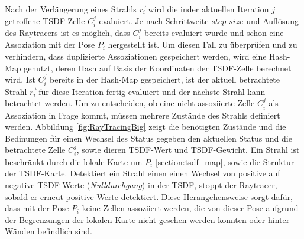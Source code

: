 Nach der Verlängerung eines Strahls $\vec{r_i}$ wird die inder aktuellen Iteration $j$ getroffene TSDF-Zelle $C_i^j$ evaluiert. Je nach Schrittweite $step\_size$ und Auflösung des Raytracers ist es möglich, dass $C_i^j$ bereits evaluiert wurde und schon eine Assoziation mit der Pose $P_i$ hergestellt ist. Um diesen Fall zu überprüfen und zu verhindern, dass duplizierte Assoziationen gespeichert werden, wird eine Hash-Map genutzt, deren Hash auf Basis der Koordinaten der TSDF-Zelle berechnet wird. Ist $C_i^j$ bereits in der Hash-Map gespeichert, ist der aktuell betrachtete Strahl $\vec{r_i}$ für diese Iteration fertig evaluiert und der nächste Strahl kann betrachtet werden. Um zu entscheiden, ob eine nicht assoziierte Zelle $C_i^j$ als Assoziation in Frage kommt, müssen mehrere Zustände des Strahls definiert werden. Abbildung \ref{fig:RayTracingBig} zeigt die benötigten Zustände und die Bedinungen für einen Wechsel des Status gegeben den aktuellen Status und die betrachtete Zelle $C_i^j$, sowie dieren TSDF-Wert und TSDF-Gewicht. Ein Strahl ist beschränkt durch die lokale Karte um $P_i$ \ref{section:tsdf_map}, sowie die Struktur der TSDF-Karte. Detektiert ein Strahl einen einen Wechsel von positive auf negative TSDF-Werte (\emph{Nulldurchgang}) in der TSDF, stoppt der Raytracer, sobald er erneut positive Werte detektiert. Diese Herangehensweise sorgt dafür, dass mit der Pose $P_i$ keine Zellen assoziiert werden, die von dieser Pose aufgrund der Begrenzungen der lokalen Karte nicht gesehen werden konnten oder hinter Wänden befindlich sind.

